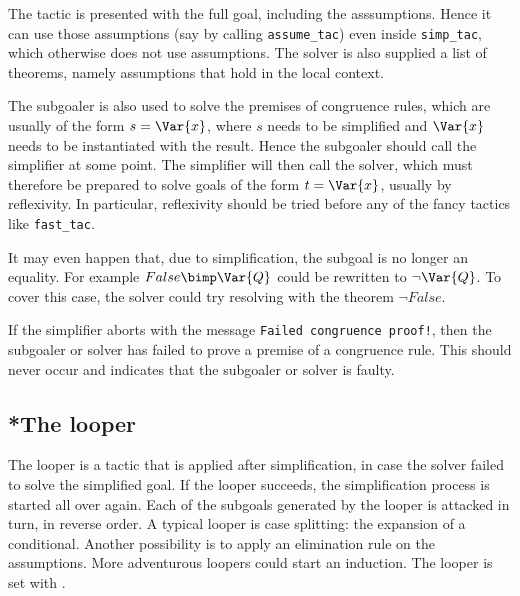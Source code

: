 The tactic is presented with the full goal, including the asssumptions.
Hence it can use those assumptions (say by calling {\tt assume_tac}) even
inside {\tt simp_tac}, which otherwise does not use assumptions.  The
solver is also supplied a list of theorems, namely assumptions that hold in
the local context.

The subgoaler is also used to solve the premises of congruence rules, which
are usually of the form $s = \Var{x}$, where $s$ needs to be simplified and
$\Var{x}$ needs to be instantiated with the result.  Hence the subgoaler
should call the simplifier at some point.  The simplifier will then call the
solver, which must therefore be prepared to solve goals of the form $t =
\Var{x}$, usually by reflexivity.  In particular, reflexivity should be
tried before any of the fancy tactics like {\tt fast_tac}.  

It may even happen that, due to simplification, the subgoal is no longer an
equality.  For example $False \bimp \Var{Q}$ could be rewritten to
$\neg\Var{Q}$.  To cover this case, the solver could try resolving with the
theorem $\neg False$.

\begin{warn}
  If the simplifier aborts with the message {\tt Failed congruence proof!},
  then the subgoaler or solver has failed to prove a premise of a
  congruence rule.  This should never occur and indicates that the
  subgoaler or solver is faulty.
\end{warn}


\subsection{*The looper}
The looper is a tactic that is applied after simplification, in case the
solver failed to solve the simplified goal.  If the looper succeeds, the
simplification process is started all over again.  Each of the subgoals
generated by the looper is attacked in turn, in reverse order.  A
typical looper is case splitting: the expansion of a conditional.  Another
possibility is to apply an elimination rule on the assumptions.  More
adventurous loopers could start an induction.  The looper is set with 
.


